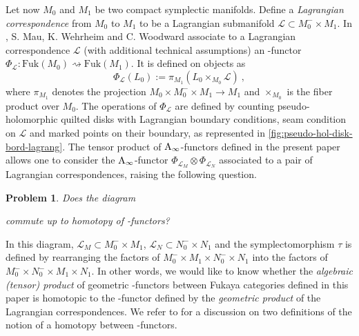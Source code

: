 \documentclass[10pt]{amsart}
\newtheorem*{problem}{Problem}
\theoremstyle{remark}
\begin{document}
Let now $M_0$ and $M_1$ be two compact symplectic manifolds. Define a \emph{Lagrangian correspondence} from $M_0$ to $M_1$ to be a Lagrangian submanifold $\mathcal{L} \subset M_0^{-} \times M_1$.
In \cite{mau-wehrheim-woodward}, S. Mau, K. Wehrheim and C. Woodward associate to a Lagrangian correspondence $\mathcal{L}$ (with additional technical assumptions) an \Ainf -functor $\Phi_{\mathcal{L}} : \mathrm{Fuk}(M_0) \rightsquigarrow \mathrm{Fuk}(M_1)$.  
It is defined on objects as 
\[ \Phi_{\mathcal{L}} (L_0) := \pi_{M_1} ( L_0 \times_{M_0} \mathcal{L} ) \ , \]
where $\pi_{M_1}$ denotes the projection $M_0 \times M_0^{-} \times M_1 \rightarrow M_1$ and $\times_{M_0}$ is the fiber product over $M_0$. The operations of $\Phi_{\mathcal{L}}$ are defined by counting pseudo-holomorphic quilted disks with Lagrangian boundary conditions, seam condition on $\mathcal{L}$ and marked points on their boundary, as represented in \cref{fig:pseudo-hol-disk-bord-lagrang}. 
The tensor product of $\mathrm{A}_\infty$-functors defined in the present paper allows one to consider the $\mathrm{A}_\infty$-functor $\Phi_{\mathcal{L}_M} \otimes \Phi_{\mathcal{L}_N}$ associated to a pair of Lagrangian correspondences, raising the following question. 

\begin{samepage}
\begin{problem} \label{problem}
Does the diagram
\begin{center} 
\end{center}
commute up to homotopy of \Ainf -functors? 
\end{problem}
\end{samepage}

In this diagram, $\mathcal{L}_M \subset M_0^{-} \times M_1$, $\mathcal{L}_N \subset N_0^- \times N_1$ and the symplectomorphism $\tau$ is defined by rearranging the factors of $M_0^{-} \times M_1 \times N_0^- \times N_1$ into the factors of $M_0^{-} \times N_0^- \times M_1 \times N_1$. In other words, we would like to know whether the \emph{algebraic (tensor) product} of geometric \Ainf -functors between Fukaya categories defined in this paper is homotopic to the \Ainf -functor defined by the \emph{geometric product} of the Lagrangian correspondences. 
We refer to \cite[Section 13]{fukaya-unobstructed} for a discussion on two definitions of the notion of a homotopy between \Ainf -functors.
\end{document}

